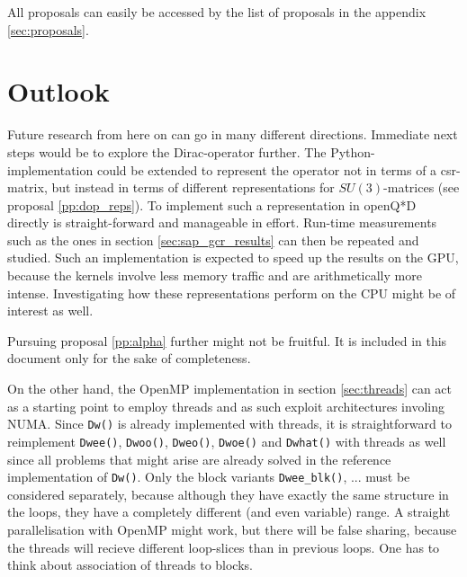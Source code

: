 \documentclass{article}
\theoremstyle{plain} %
\theoremstyle{convention} %
\theoremstyle{remark} %
\def\code#1{\texttt{#1}}
\numberwithin{equation}{section}
\begin{document}
All proposals can easily be accessed by the list of proposals in the appendix \ref{sec:proposals}.

\section{Outlook}

\label{sec:outlook}

Future research from here on can go in many different directions. Immediate next steps would be to explore the Dirac-operator further. The Python-implementation could be extended to represent the operator not in terms of a \acrshort{csr}-matrix, but instead in terms of different representations for $SU(3)$-matrices (see proposal \ref{pp:dop_reps}). To implement such a representation in openQ*D directly is straight-forward and manageable in effort. Run-time measurements such as the ones in section \ref{sec:sap_gcr_results} can then be repeated and studied. Such an implementation is expected to speed up the results on the GPU, because the kernels involve less memory traffic and are arithmetically more intense. Investigating how these representations perform on the CPU might be of interest as well.

Pursuing proposal \ref{pp:alpha} further might not be fruitful. It is included in this document only for the sake of completeness.

On the other hand, the OpenMP implementation in section \ref{sec:threads} can act as a starting point to employ threads and as such exploit architectures involing NUMA. Since \code{Dw()} is already implemented with threads, it is straightforward to reimplement \code{Dwee()}, \code{Dwoo()}, \code{Dweo()}, \code{Dwoe()} and \code{Dwhat()} with threads as well since all problems that might arise are already solved in the reference implementation of \code{Dw()}. Only the block variants \code{Dwee\_blk()}, ... must be considered separately, because although they have exactly the same structure in the loops, they have a completely different (and even variable) range. A straight parallelisation with OpenMP might work, but there will be false sharing, because the threads will recieve different loop-slices than in previous loops. One has to think about association of threads to blocks.
\end{document}
